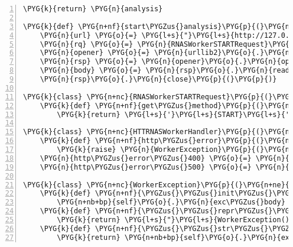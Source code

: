 \begin{Verbatim}[commandchars=\\\{\},numbers=left,firstnumber=1,stepnumber=5]
    \PYG{k}{return} \PYG{n}{analysis}

\PYG{k}{def} \PYG{n+nf}{start\PYGZus{}analysis}\PYG{p}{(}\PYG{n}{analysis}\PYG{p}{)}\PYG{p}{:}
    \PYG{n}{url} \PYG{o}{=} \PYG{l+s}{"}\PYG{l+s}{http://127.0.0.1:6543/analyses/}\PYG{l+s+si}{\PYGZpc{}d}\PYG{l+s}{"}
    \PYG{n}{rq} \PYG{o}{=} \PYG{n}{RNASWorkerSTARTRequest}\PYG{p}{(}\PYG{n}{url} \PYG{o}{\PYGZpc{}} \PYG{n}{analysis}\PYG{o}{.}\PYG{n}{id}\PYG{p}{)}
    \PYG{n}{opener} \PYG{o}{=} \PYG{n}{urllib2}\PYG{o}{.}\PYG{n}{build\PYGZus{}opener}\PYG{p}{(}\PYG{n}{HTTRNASWorkerHandler}\PYG{p}{(}\PYG{p}{)}\PYG{p}{)}
    \PYG{n}{rsp} \PYG{o}{=} \PYG{n}{opener}\PYG{o}{.}\PYG{n}{open}\PYG{p}{(}\PYG{n}{rq}\PYG{p}{)}
    \PYG{n}{body} \PYG{o}{=} \PYG{n}{rsp}\PYG{o}{.}\PYG{n}{read}\PYG{p}{(}\PYG{p}{)}
    \PYG{n}{rsp}\PYG{o}{.}\PYG{n}{close}\PYG{p}{(}\PYG{p}{)}

\PYG{k}{class} \PYG{n+nc}{RNASWorkerSTARTRequest}\PYG{p}{(}\PYG{n}{urllib2}\PYG{o}{.}\PYG{n}{Request}\PYG{p}{)}\PYG{p}{:}
    \PYG{k}{def} \PYG{n+nf}{get\PYGZus{}method}\PYG{p}{(}\PYG{n+nb+bp}{self}\PYG{p}{)}\PYG{p}{:}
        \PYG{k}{return} \PYG{l+s}{'}\PYG{l+s}{START}\PYG{l+s}{'}

\PYG{k}{class} \PYG{n+nc}{HTTRNASWorkerHandler}\PYG{p}{(}\PYG{n}{urllib2}\PYG{o}{.}\PYG{n}{HTTPHandler}\PYG{p}{)}\PYG{p}{:}
    \PYG{k}{def} \PYG{n+nf}{http\PYGZus{}error}\PYG{p}{(}\PYG{n+nb+bp}{self}\PYG{p}{,} \PYG{n}{req}\PYG{p}{,} \PYG{n}{fp}\PYG{p}{,} \PYG{n}{code}\PYG{p}{,} \PYG{n}{msg}\PYG{p}{,} \PYG{n}{hdrs}\PYG{p}{)}\PYG{p}{:}
        \PYG{k}{raise} \PYG{n}{WorkerException}\PYG{p}{(}\PYG{n}{fp}\PYG{o}{.}\PYG{n}{read}\PYG{p}{(}\PYG{p}{)}\PYG{p}{)}
    \PYG{n}{http\PYGZus{}error\PYGZus{}400} \PYG{o}{=} \PYG{n}{http\PYGZus{}error}
    \PYG{n}{http\PYGZus{}error\PYGZus{}500} \PYG{o}{=} \PYG{n}{http\PYGZus{}error}

\PYG{k}{class} \PYG{n+nc}{WorkerException}\PYG{p}{(}\PYG{n+ne}{Exception}\PYG{p}{)}\PYG{p}{:}
    \PYG{k}{def} \PYG{n+nf}{\PYGZus{}\PYGZus{}init\PYGZus{}\PYGZus{}}\PYG{p}{(}\PYG{n+nb+bp}{self}\PYG{p}{,} \PYG{n}{exc\PYGZus{}body}\PYG{p}{)}\PYG{p}{:}
        \PYG{n+nb+bp}{self}\PYG{o}{.}\PYG{n}{exc\PYGZus{}body} \PYG{o}{=} \PYG{n}{exc\PYGZus{}body}
    \PYG{k}{def} \PYG{n+nf}{\PYGZus{}\PYGZus{}repr\PYGZus{}\PYGZus{}}\PYG{p}{(}\PYG{n+nb+bp}{self}\PYG{p}{)}\PYG{p}{:}
        \PYG{k}{return} \PYG{l+s}{"}\PYG{l+s}{WorkerException()}\PYG{l+s}{"}
    \PYG{k}{def} \PYG{n+nf}{\PYGZus{}\PYGZus{}str\PYGZus{}\PYGZus{}}\PYG{p}{(}\PYG{n+nb+bp}{self}\PYG{p}{)}\PYG{p}{:}
        \PYG{k}{return} \PYG{n+nb+bp}{self}\PYG{o}{.}\PYG{n}{exc\PYGZus{}body}
\end{Verbatim}


